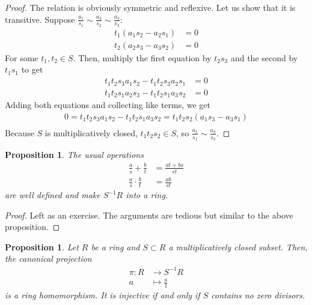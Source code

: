 \documentclass[11pt]{article}
\newtheorem{prop}[theorem]{Proposition}
\theoremstyle{definition}
\begin{document}
            \begin{proof}
                The relation is obviously symmetric and reflexive.
                Let us show that it is transitive.
                Suppose $\frac{a_1}{s_1} \sim \frac{a_2}{s_2} \sim \frac{a_3}{s_3} $:
                \begin{align}
                    t_1 (a_1 s_2 - a_2 s_1) &= 0 \nonumber \\
                    t_2 (a_2 s_3 - a_3 s_2) &= 0 \nonumber
                \end{align}
                For some $t_1, t_2 \in S$.
                Then, multiply the first equation by $t_2 s_3$ and the second by $t_1 s_1$ to get
                \begin{align}
                    t_1 t_2 s_3 a_1 s_2 - t_1 t_2 s_3 a_2 s_1 &= 0 \nonumber \\
                    t_1 t_2 s_1 a_2 s_3 - t_1 t_2 s_1 a_3 s_2 &= 0 \nonumber
                \end{align}
                Adding both equations and collecting like terms, we get
                \begin{align}
                    0 = t_1 t_2 s_3 a_1 s_2 - t_1 t_2 s_1 a_3 s_2 = t_1 t_2 s_2 (a_1 s_3 - a_3 s_1)  \nonumber \\
                \end{align}
                Because $S$ is multiplicatively closed, $t_1 t_2 s_2 \in S$, so $\frac{a_1}{s_1} \sim \frac{a_3}{s_3}$.

            \end{proof}

        \begin{prop}
            The usual operations
            \begin{align}
                \frac{a}{s} + \frac{b}{t} &= \frac{at + bs}{st} \nonumber \\
                \frac{a}{s} \cdot \frac{b}{t} &= \frac{ab}{st} \nonumber
            \end{align}
            are well defined and make $S^{-1}R$ into a ring.
        \end{prop}
            \begin{proof}
                Left as an exercise.
                The arguments are tedious but similar to the above proposition. %
            \end{proof}

        \begin{prop}
            Let $R$ be a ring and $S \subset R$ a multiplicatively closed subset.
            Then, the canonical projection
                \begin{align}
                \pi: R &\rightarrow S^{-1}R \nonumber \\
                    a &\mapsto \frac{a}{1} \nonumber
                \end{align}
            is a ring homomorphism.
            It is injective if and only if $S$ contains no zero divisors.
        \end{prop}
\end{document}
